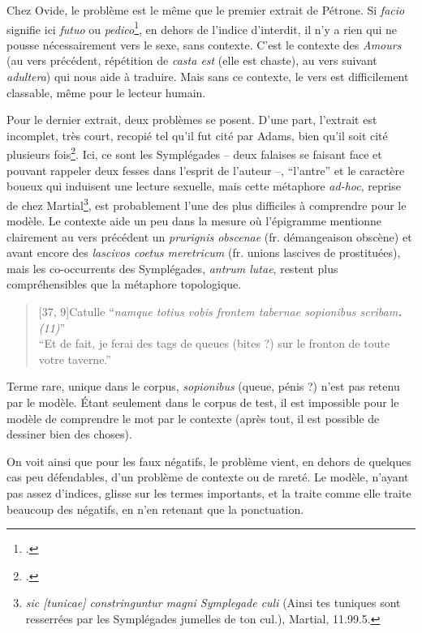 Chez Ovide, le problème est le même que le premier extrait de Pétrone. Si \textit{facio} signifie ici \textit{futuo} ou \textit{pedico}\footcite[p.204]{adams}, en dehors de l'indice d'interdit, il n'y a rien qui ne pousse nécessairement vers le sexe, sans contexte. C'est le contexte des \textit{Amours} (au vers précédent, répétition de \textit{casta est} (elle est chaste), au vers suivant \textit{adultera}) qui nous aide à traduire. Mais sans ce contexte, le vers est difficilement classable, même pour le lecteur humain.

Pour le dernier extrait, deux problèmes se posent. D'une part, l'extrait est incomplet, très court, recopié tel qu'il fut cité par Adams, bien qu'il soit cité plusieurs fois\footcite[pp.114, 172 et 240]{adams}. Ici, ce sont les Symplégades -- deux falaises se faisant face et pouvant rappeler deux fesses dans l'esprit de l'auteur --, ``l'antre'' et le caractère boueux qui induisent une lecture sexuelle, mais cette métaphore \textit{ad-hoc}, reprise de chez Martial\footnote{\textit{sic {[tunicae]} constringuntur magni Symplegade culi} (Ainsi tes tuniques sont resserrées par les Symplégades jumelles de ton cul.), Martial, 11.99.5.}, est probablement l'une des plus difficiles à comprendre pour le modèle. Le contexte aide un peu dans la mesure où l'épigramme mentionne clairement au vers précédent un \textit{prurignis obscenae} (fr. démangeaison obscène) et avant encore des \textit{lascivos coetus meretricum} (fr. unions lascives de prostituées), mais les co-occurrents des Symplégades, \textit{antrum lutae}, restent plus compréhensibles que la métaphore topologique.

\starbreak

\begin{quote}[37, 9]{Catulle}
    \enquote{\textit{namque totius vobis frontem tabernae sopionibus scribam\textbf{.} (11)}} \\
    \enquote{Et de fait, je ferai des tags de queues (bites ?) sur le fronton de toute votre taverne.}
\end{quote}

Terme rare, unique dans le corpus, \textit{sopionibus} (queue, pénis ?) n'est pas retenu par le modèle. Étant seulement dans le corpus de test, il est impossible pour le modèle de comprendre le mot par le contexte (après tout, il est possible de dessiner bien des choses).

On voit ainsi que pour les faux négatifs, le problème vient, en dehors de quelques cas peu défendables, d'un problème de contexte ou de rareté. Le modèle, n'ayant pas assez d'indices, glisse sur les termes importants, et la traite comme elle traite beaucoup des négatifs, en n'en retenant que la ponctuation.

